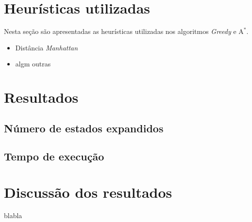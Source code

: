 \documentclass{article}
\begin{document}
\section{Heurísticas utilizadas}

Nesta seção são apresentadas as heurísticas utilizadas nos algoritmos \textit{Greedy} e \(\text{A}^*\).

\begin{itemize}
	\item Distância \textit{Manhattan}
	\item algm outras
\end{itemize}

\section{Resultados}

\subsection{Número de estados expandidos}

\subsection{Tempo de execução}

\section{Discussão dos resultados}

blabla
\end{document}

